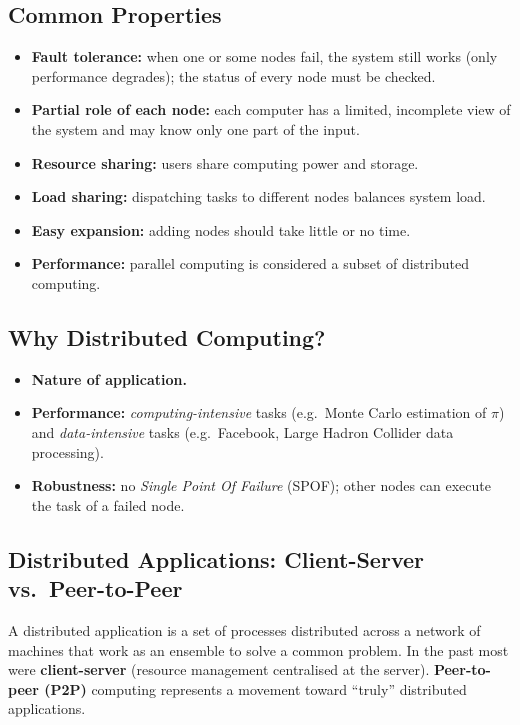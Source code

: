 \documentclass[11pt,a4paper,openany]{report}
\begin{document}
\subsection{Common Properties}
\begin{itemize}[leftmargin=*]
  \item \textbf{Fault tolerance:} when one or some nodes fail, the system still works
        (only performance degrades); the status of every node must be checked.
  \item \textbf{Partial role of each node:} each computer has a limited, incomplete view of
        the system and may know only one part of the input.
  \item \textbf{Resource sharing:} users share computing power and storage.
  \item \textbf{Load sharing:} dispatching tasks to different nodes balances system load.
  \item \textbf{Easy expansion:} adding nodes should take little or no time.
  \item \textbf{Performance:} parallel computing is considered a subset of distributed computing.
\end{itemize}

\subsection{Why Distributed Computing?}
\begin{itemize}[leftmargin=*]
  \item \textbf{Nature of application.}
  \item \textbf{Performance:} \emph{computing-intensive} tasks (e.g.\ Monte Carlo
        estimation of $\pi$) and \emph{data-intensive} tasks (e.g.\ Facebook, Large Hadron
        Collider data processing).
  \item \textbf{Robustness:} no \emph{Single Point Of Failure} (SPOF); other nodes can execute
        the task of a failed node.
\end{itemize}

\subsection{Distributed Applications: Client-Server vs.\ Peer-to-Peer}
A distributed application is a set of processes distributed across a network of machines that
work as an ensemble to solve a common problem. In the past most were \textbf{client-server}
(resource management centralised at the server). \textbf{Peer-to-peer (P2P)} computing
represents a movement toward ``truly'' distributed applications.
\end{document}
